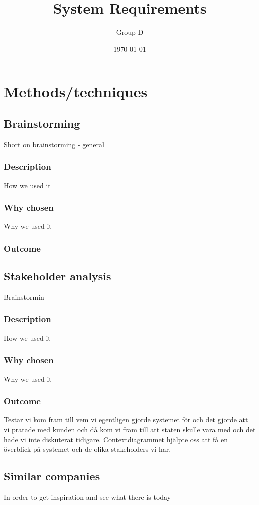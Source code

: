 \documentclass[a4paper]{article}
\title{System Requirements}
\author{Group D}
\date{\today}
\begin{document}
  \tableofcontents

  \section{Methods/techniques}
  \subsection{Brainstorming}
  Short on brainstorming - general
    \subsubsection{Description}
    How we used it
    \subsubsection{Why chosen}
    Why we used it
    \subsubsection{Outcome}
    
    \subsection{Stakeholder analysis}
    Brainstormin
    \subsubsection{Description}
    How we used it
    \subsubsection{Why chosen}
    Why we used it
    \subsubsection{Outcome}
    Testar
    vi kom fram till vem vi egentligen gjorde systemet för och det gjorde att vi pratade med kunden och då kom vi fram till att staten skulle vara med och det hade vi inte diskuterat tidigare. 
Contextdiagrammet hjälpte oss att få en överblick på systemet och de olika stakeholders vi har.
    
    \subsection{Similar companies}
    In order to get inspiration and see what there is today
	
\end{document}
